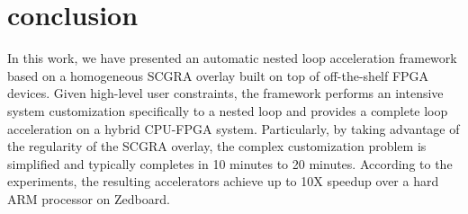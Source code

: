 %
%
%
%
\section{conclusion} \label{sec:conclusion}
In this work, we have presented an automatic nested loop acceleration 
framework based on a homogeneous SCGRA overlay built on top of 
off-the-shelf FPGA devices. Given high-level user constraints, 
the framework performs an intensive system customization specifically 
to a nested loop and provides a complete loop acceleration on a hybrid CPU-FPGA system.
Particularly, by taking advantage of the regularity of 
the SCGRA overlay, the complex customization problem is simplified and typically completes in 10
minutes to 20 minutes. According to the experiments, the resulting accelerators achieve up to 10X
speedup over a hard ARM processor on Zedboard. 

